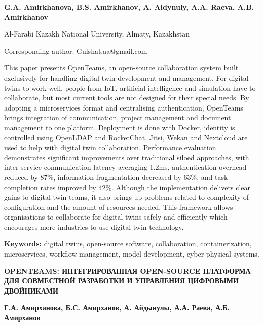 
\begin{header}

{\bfseries
G.A. Amirkhanova\envelope,
B.S. Amirkhanov,
A. Aidynuly,
A.A. Raeva,
A.B. Amirkhanov
}
\end{header}

\begin{affil}
Al-Farabi Kazakh National University, Almaty, Kazakhstan

\envelope Corresponding author: Gulshat.aa@gmail.com
\end{affil}

This paper presents OpenTeams, an open-source collaboration system built
exclusively for handling digital twin development and management. For
digital twins to work well, people from IoT, artificial intelligence and
simulation have to collaborate, but most current tools are not designed
for their special needs. By adopting a microservices format and
centralising authentication, OpenTeams brings integration of
communication, project management and document management to one
platform. Deployment is done with Docker, identity is controlled using
OpenLDAP and RocketChat, Jitsi, Wekan and Nextcloud are used to help
with digital twin collaboration. Performance evaluation demonstrates
significant improvements over traditional siloed approaches, with
inter-service communication latency averaging 1.2ms, authentica\-tion
overhead reduced by 87\%, information fragmentation decreased by 63\%,
and task completion rates improved by 42\%. Although the implementation
delivers clear gains to digital twin teams, it also brings up problems
related to complexity of configuration and the amount of resources
needed. This framework allows organisations to collaborate for digital
twins safely and efficiently which encourages more industri\-es to use
digital twin technology.

{\bfseries Keywords:} digital twins, open-source software, collaboration,
containerization, microservices, work\-flow management, model development,
cyber-physical systems.

\begin{header}
{\bfseries OPENTEAMS: ИНТЕГРИРОВАННАЯ OPEN-SOURCE ПЛАТФОРМА ДЛЯ СОВМЕСТНОЙ РАЗРАБОТКИ И УПРАВЛЕНИЯ ЦИФРОВЫМИ ДВОЙНИКАМИ}

{\bfseries
Г.А. Амирханова\envelope,
Б.С. Амирханов,
А. Айдынулы,
А.А. Раева,
А.Б. Амирханов
}
\end{header}

